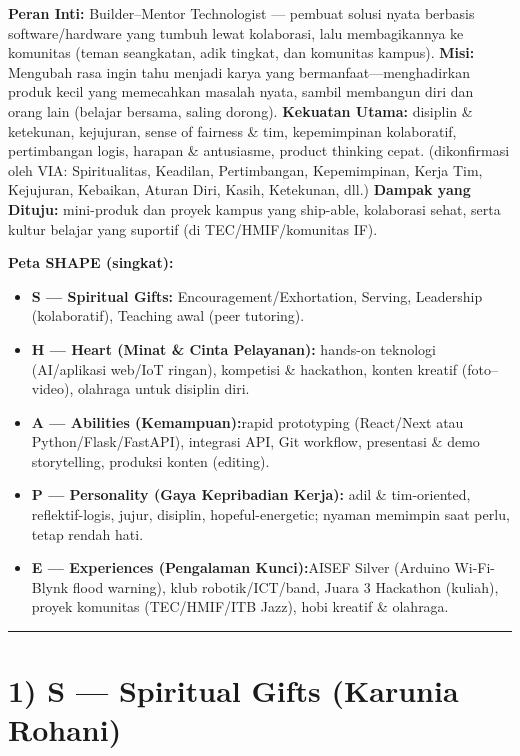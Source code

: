 \documentclass[
  letterpaper,
  DIV=11,
  numbers=noendperiod]{scrreprt}
\providecommand{\tightlist}{%
  \setlength{\itemsep}{0pt}\setlength{\parskip}{0pt}}
\begin{document}
\textbf{Peran Inti:} Builder--Mentor Technologist --- pembuat solusi
nyata berbasis software/hardware yang tumbuh lewat kolaborasi, lalu
membagikannya ke komunitas (teman seangkatan, adik tingkat, dan
komunitas kampus). \textbf{Misi:} Mengubah rasa ingin tahu menjadi karya
yang bermanfaat---menghadirkan produk kecil yang memecahkan masalah
nyata, sambil membangun diri dan orang lain (belajar bersama, saling
dorong). \textbf{Kekuatan Utama:} disiplin \& ketekunan, kejujuran,
sense of fairness \& tim, kepemimpinan kolaboratif, pertimbangan logis,
harapan \& antusiasme, product thinking cepat. (dikonfirmasi oleh VIA:
Spiritualitas, Keadilan, Pertimbangan, Kepemimpinan, Kerja Tim,
Kejujuran, Kebaikan, Aturan Diri, Kasih, Ketekunan, dll.) \textbf{Dampak
yang Dituju:} mini-produk dan proyek kampus yang ship-able, kolaborasi
sehat, serta kultur belajar yang suportif (di TEC/HMIF/komunitas IF).

\textbf{Peta SHAPE (singkat):}

\begin{itemize}
\tightlist
\item
  \textbf{S --- Spiritual Gifts:} Encouragement/Exhortation, Serving,
  Leadership (kolaboratif), Teaching awal (peer tutoring).
\item
  \textbf{H --- Heart (Minat \& Cinta Pelayanan):} hands-on teknologi
  (AI/aplikasi web/IoT ringan), kompetisi \& hackathon, konten kreatif
  (foto--video), olahraga untuk disiplin diri.
\item
  \textbf{A --- Abilities (Kemampuan):}rapid prototyping (React/Next
  atau Python/Flask/FastAPI), integrasi API, Git workflow, presentasi \&
  demo storytelling, produksi konten (editing).
\item
  \textbf{P --- Personality (Gaya Kepribadian Kerja):} adil \&
  tim-oriented, reflektif-logis, jujur, disiplin, hopeful-energetic;
  nyaman memimpin saat perlu, tetap rendah hati.
\item
  \textbf{E --- Experiences (Pengalaman Kunci):}AISEF Silver (Arduino
  Wi-Fi-Blynk flood warning), klub robotik/ICT/band, Juara 3 Hackathon
  (kuliah), proyek komunitas (TEC/HMIF/ITB Jazz), hobi kreatif \&
  olahraga.
\end{itemize}

\begin{center}\rule{0.5\linewidth}{0.5pt}\end{center}

\section{1) S --- Spiritual Gifts (Karunia
Rohani)}\label{s-spiritual-gifts-karunia-rohani}
\end{document}
